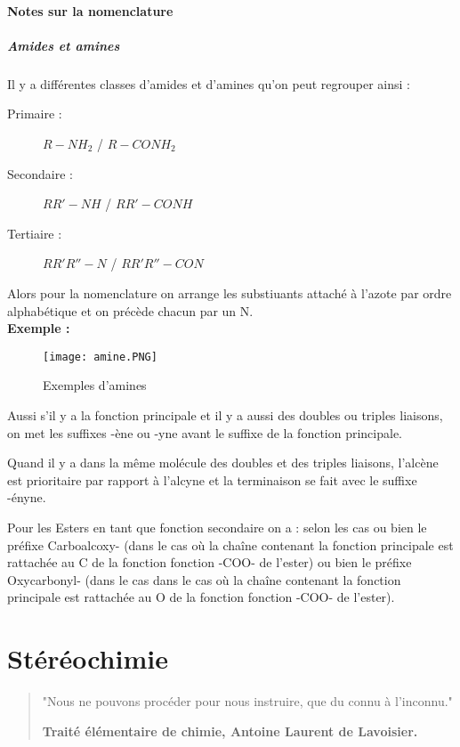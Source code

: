 \documentclass[a4paper, oneside]{book}
\begin{document}
\subsection*{Notes sur la nomenclature}
\subsubsection{Amides et amines}
Il y a différentes classes d'amides et d'amines qu'on peut regrouper ainsi :
\begin{description}
    \item[Primaire :] $R-NH_2$ / $R-CONH_2$
    \item[Secondaire :] $RR'-NH$ / $RR'-CONH$
    \item[Tertiaire :] $RR'R''-N$ / $RR'R''-CON$
\end{description}
Alors pour la nomenclature on arrange les substiuants attaché à l'azote par ordre alphabétique et on précède chacun par un N.\\ 
\textbf{Exemple :}
\begin{figure}[!h]
    \centering
    \texttt{[image: amine.PNG]}
    \caption{Exemples d'amines}
    \label{fig:my_label}
\end{figure}
\newpage
Aussi s'il y a la fonction principale et il y a aussi des doubles ou triples liaisons, on met les suffixes -ène ou -yne avant le suffixe de la fonction principale. 

Quand il y a dans la même molécule des doubles et des triples liaisons, l'alcène est prioritaire par rapport à l'alcyne et la terminaison se fait avec le suffixe -ényne.

Pour les Esters en tant que fonction secondaire on a : selon les cas ou bien le préfixe Carboalcoxy- (dans le cas où la chaîne contenant la fonction principale est rattachée au C de la fonction fonction -COO- de l'ester) ou bien le préfixe Oxycarbonyl- (dans le cas dans le cas où la chaîne contenant la fonction principale est rattachée au O de la fonction fonction -COO- de l'ester).

\part{Stéréochimie}
\begin{quotation}
\vspace*{7cm}
\LARGE{"Nous ne pouvons procéder pour nous instruire, que du connu à l’inconnu."\\
\begin{center}
    \textbf{Traité élémentaire de chimie, Antoine Laurent de Lavoisier.}
\end{center}}
\end{quotation}
\end{document}
